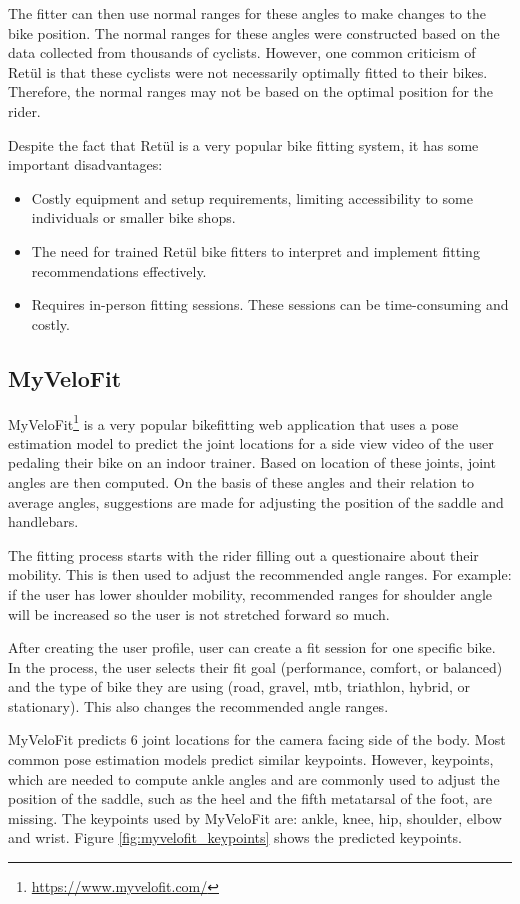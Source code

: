 The fitter can then use normal ranges for these angles to make changes to the bike position. The normal ranges for these angles were constructed based on the data collected from thousands of cyclists. However, one common criticism of Retül is that these cyclists were not necessarily optimally fitted to their bikes. Therefore, the normal ranges may not be based on the optimal position for the rider.


Despite the fact that Retül is a very popular bike fitting system, it has some important disadvantages:
\begin{itemize}
    \item Costly equipment and setup requirements, limiting accessibility to some individuals or smaller bike shops.
    \item The need for trained Retül bike fitters to interpret and implement fitting recommendations effectively.
    \item Requires in-person fitting sessions. These sessions can be time-consuming and costly.
\end{itemize}

\subsection{MyVeloFit}
MyVeloFit\footnote{\url{https://www.myvelofit.com/}} is a very popular bikefitting web application that uses a pose estimation model to predict the joint locations for a side view video of the user pedaling their bike on an indoor trainer. Based on location of these joints, joint angles are then computed. On the basis of these angles and their relation to average angles, suggestions are made for adjusting the position of the saddle and handlebars.

The fitting process starts with the rider filling out a questionaire about their mobility. This is then used to adjust the recommended angle ranges. For example: if the user has lower shoulder mobility, recommended ranges for shoulder angle will be increased so the user is not stretched forward so much.

After creating the user profile, user can create a fit session for one specific bike. In the process, the user selects their fit goal (performance, comfort, or balanced) and the type of bike they are using (road, gravel, mtb, triathlon, hybrid, or stationary). This also changes the recommended angle ranges.

MyVeloFit predicts 6 joint locations for the camera facing side of the body. Most common pose estimation models predict similar keypoints. However, keypoints, which are needed to compute ankle angles and are commonly used to adjust the position of the saddle, such as the heel and the fifth metatarsal of the foot, are missing. The keypoints used by MyVeloFit are: ankle, knee, hip, shoulder, elbow and wrist. Figure \ref{fig:myvelofit_keypoints} shows the predicted keypoints.


